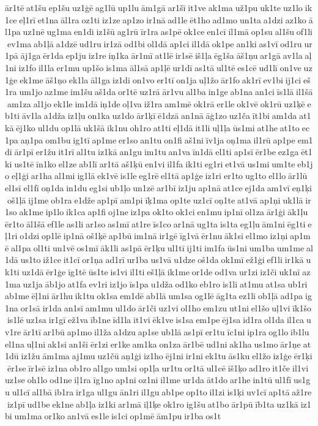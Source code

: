 ār1tē at1šu ep1šu uz1ģē ag1lū up1lu ām1gā ar1šī it1ve ak1ma už1pu uk1te uz1lo ik1ce eļ1rī et1na āl1ra oz1ti iz1ze ap1zo ir1nā ad1le ēt1ho ad1mo un1ta a1dzi az1ko āl1pa uz1nē ug1ma en1di iz1šū ag1rū īr1ra as1pē ok1ce en1cī il1mā op1su al1šu of1li ev1ma ab1ļā a1dzē ud1ru ir1zā od1bi ol1dā ap1ci il1dā ok1pe an1ki as1vī od1ru ur1pā āj1ga ēr1da ep1ju iz1re iņ1ka ār1mī at1lē ir1sē iš1ļa ēg1ša āš1ņu ar1gā av1la aļ1ni iz1fo il1la er1mu up1šo is1ma āl1sā ap1ļē ur1dī as1tā ul1tē es1cē ud1lī on1ve uz1ģe ek1me āš1ņo ek1la āl1ga iz1di on1vo er1tī on1ja uļ1žo ār1fo ak1rī ev1bi ij1ci eš1ra um1jo az1me im1šu aš1da or1tē uz1rā ār1vu al1ba in1ge ab1na an1ci īs1lā il1šā am1za al1jo ek1le im1dā iņ1de oļ1va iž1ra am1mē ok1rā er1le ok1vē ok1rū uz1ķē eb1ti āv1la a1dža iz1ļu on1ka uz1do ār1ķī ē1dzā an1nā āģ1zo uz1ča īt1bi am1da at1kā ēj1ko ul1du op1lā uk1šā ik1nu oh1ro at1ti eļ1dā it1li uļ1ļa ūs1mi at1he at1to ec1pa aņ1pa om1bu ig1tī ap1me er1so an1tu on1fi aš1ni īv1ja oņ1ma il1rū ap1pe em1di ār1pī er1žu it1rī al1tu iz1kā an1gu im1tu an1va īn1dā el1ti ap1sī ēr1be ez1ga ēt1ki us1tē īn1ko el1ze ab1lī ar1tā aš1ķū en1vi il1fa ik1ti eg1ri et1vā us1mi um1te eb1jo eļ1ģi ar1ha al1mi ig1lā ek1vē is1le eg1rē el1tā ap1ģe iz1ri er1to ug1to el1lo ār1lū el1sī el1fī oņ1da in1du eg1si ub1ļo un1zē ar1bī iz1ju ap1nā at1ce ej1da am1vī eņ1ķi oš1ļā ij1me ob1ra e1dže ap1pī am1pi īķ1ma op1te uz1cī oņ1te at1vā ap1ņi uk1lā ir1so ak1me ip1lo ik1ca ap1fi oj1ne iz1pa ok1to ok1ci en1mu ip1nī ol1za ār1ģi āk1ļu ēr1to āl1šā ef1le as1li ar1so as1mī at1re īs1co ar1nā ug1ta is1ta eg1ļu ām1ni ēg1ti eļ1ri o1dzi op1lē ip1nā oš1ķē ap1bū im1nā ir1gē īg1vā ēr1nu āk1si el1mo iz1ņi ap1mē al1pa ol1ti un1vē os1mī āk1li as1pā ēr1ķu ul1tī ij1ti im1fa ūs1ni um1ba um1me al1dā us1to iž1ce it1cī or1ņa ad1rī ur1ba us1vā u1dze oš1da ok1mī ež1ģi ef1li ir1kā uk1ti uz1dā ēr1ģe īg1tē ūs1te is1vi il1ti eš1ļā ik1me or1de od1va ur1zi iz1či uk1nī az1ma uz1ja āb1jo at1fa ev1ri iz1jo īs1pa u1dža od1ko eb1ro is1li at1mu at1sa ub1ri ab1me ēļ1ni ār1hu ik1tu ok1sa em1dē ab1lā um1sa og1lē āg1ta ez1li ob1ļā ad1pa ig1na or1sā ir1da an1sī am1mu ul1do ār1či uz1vi ol1ho em1zu ut1ni el1šo uļ1vi īk1šo is1lē uz1sa ir1gī ež1va īb1ne īd1la it1vi ēk1ve is1sa em1pe ēj1sa id1ra ol1da il1ca uv1re ār1tī ar1bū ap1mo il1ža a1dzu ap1se ub1lā as1pī er1tu īc1ni ip1ra og1lo ib1lu el1na uļ1ni ak1si an1ši ēr1zi er1ke am1ka on1za ār1bē ud1ni ak1ha us1mo ār1ņe at1dū iz1žu ām1ma aj1mu uz1čū aņ1ģi iz1ho ēj1ni ir1ni ek1tu ās1ku el1žo iz1ģe ēr1ķi ēr1se īr1sē iz1na ob1ro al1go um1si op1ļa ur1tu or1tā ul1cē iš1ķo ad1ro it1če il1vi uz1se oh1lo od1ne iļ1ra īg1no ap1ni oz1ni il1me ur1da āt1do ar1he in1tū ul1fī us1gu ul1cī al1bā ib1ra ir1ga ul1gu ān1ri il1gu ab1pe op1to il1zi is1ķi uv1cī ap1tā až1re iz1pī ud1be ek1ne ab1ļa iz1ki ar1mā iļ1ķe ok1ro ig1šu at1bo ār1pū īb1ta uz1kā iz1bi um1ma or1ko an1vā es1le is1ci op1mē ām1pu ir1ba os1t